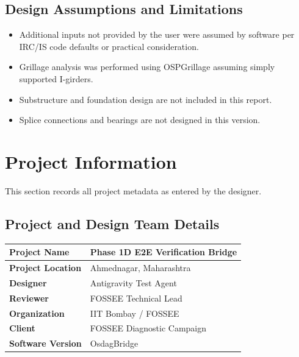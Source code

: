 \documentclass[12pt,a4paper]{report}
\numberwithin{table}{chapter}
\numberwithin{figure}{chapter}
\begin{document}
\section*{Design Assumptions and Limitations}
\label{sec:assumptions}

\begin{itemize}
\item Additional inputs not provided by the user were assumed by software per IRC/IS code defaults or practical consideration.
\item Grillage analysis was performed using OSPGrillage assuming simply supported I-girders.
\item Substructure and foundation design are not included in this report.
\item Splice connections and bearings are not designed in this version.
\end{itemize}

\titleformat{\chapter}[block]{\normalfont\Large\bfseries\centering}{\thechapter}{1em}{}
\titlespacing*{\chapter}{0pt}{-30pt}{10pt}


\chapter{Project Information}

This section records all project metadata as entered by the designer.

\section{Project and Design Team Details}
\label{sec:project-details}

\begin{tabular}{|L{5.5cm}|L{8.5cm}|}
\hline
\textbf{Project Name} & Phase 1D E2E Verification Bridge \\
\hline
\textbf{Project Location} & Ahmednagar, Maharashtra \\
\hline
\textbf{Designer} & Antigravity Test Agent \\
\hline
\textbf{Reviewer} & FOSSEE Technical Lead \\
\hline
\textbf{Organization} & IIT Bombay / FOSSEE \\
\hline
\textbf{Client} & FOSSEE Diagnostic Campaign \\
\hline
\textbf{Software Version} & OsdagBridge \\
\hline
\end{tabular}
\end{document}
